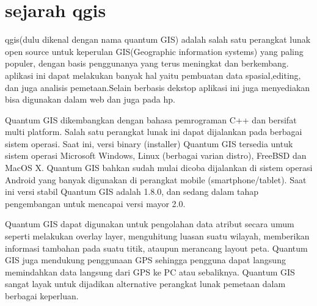 
\section{sejarah qgis}
	  qgis(dulu dikenal dengan nama quantum GIS) adalah salah satu perangkat lunak open source untuk keperulan GIS(Geographic information systems) yang paling populer, dengan basis penggunanya yang terus meningkat dan berkembang.
	 aplikasi ini dapat melakukan banyak hal yaitu pembuatan data spasial,editing, dan juga analisis pemetaan.Selain berbasis dekstop aplikasi ini juga menyediakan bisa digunakan dalam web dan juga pada hp.

	Quantum GIS dikembangkan dengan bahasa pemrograman C++ dan bersifat multi platform. Salah satu perangkat lunak ini dapat dijalankan pada berbagai sistem operasi. Saat ini, versi binary (installer) Quantum GIS tersedia untuk sistem operasi Microsoft Windows, Linux (berbagai varian distro), FreeBSD dan MacOS X. Quantum GIS bahkan sudah mulai dicoba dijalankan di sistem operasi Android yang banyak digunakan di perangkat mobile (smartphone/tablet). Saat ini versi stabil Quantum GIS adalah 1.8.0, dan sedang dalam tahap pengembangan untuk mencapai versi mayor 2.0.

	Quantum GIS dapat digunakan untuk pengolahan data atribut secara umum seperti melakukan overlay layer, menguhitung luasan suatu wilayah, memberikan informasi tambahan pada suatu titik, ataupun merancang layout peta. Quantum GIS juga mendukung penggunaan GPS sehingga pengguna dapat langsung memindahkan data langsung dari GPS ke PC atau sebaliknya. Quantum GIS sangat layak untuk dijadikan alternative perangkat lunak pemetaan dalam berbagai keperluan.

